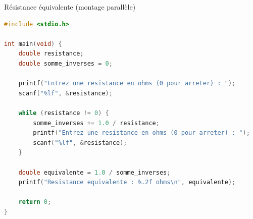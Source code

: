 \begin{UPSTIcorrectionP}{Résistance équivalente (montage parallèle)}
	\begin{lstlisting}[language=c]
#include <stdio.h>

int main(void) {
    double resistance;
    double somme_inverses = 0;

    printf("Entrez une resistance en ohms (0 pour arreter) : ");
    scanf("%lf", &resistance);

    while (resistance != 0) {
        somme_inverses += 1.0 / resistance;
        printf("Entrez une resistance en ohms (0 pour arreter) : ");
        scanf("%lf", &resistance);
    }

    double equivalente = 1.0 / somme_inverses;
    printf("Resistance equivalente : %.2f ohms\n", equivalente);

    return 0;
}
	\end{lstlisting}
\end{UPSTIcorrectionP}
